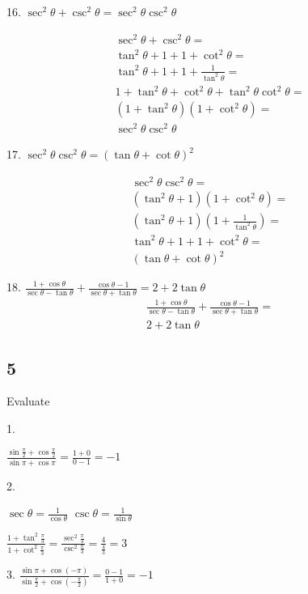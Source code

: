 \documentclass[]{report}
\begin{document}
16. $\sec^2\theta + \csc^2\theta = \sec^2\theta\csc^2\theta$

\begin{align*}
\sec^2\theta+ \csc^2\theta = \\
\tan^2\theta + 1 + 1 + \cot^2\theta = \\
\tan^2\theta + 1 + 1 + \frac{1}{\tan^2\theta}  = \\
1  + \tan^2\theta  + \cot^2\theta + \tan^2\theta\cot^2\theta = \\
(1 + \tan^2\theta)(1  +   \cot^2\theta) =  \\
\sec^2\theta\csc^2\theta
\end{align*}


17. $\sec^2\theta\csc^2\theta = (\tan \theta + \cot\theta)^2$ 

\begin{align*}
\sec^2\theta\csc^2\theta = \\
(\tan^2\theta+1)(1+\cot^2\theta) = \\
(\tan^2\theta + 1)(1 + \frac{1}{\tan^2\theta}) = \\
\tan^2\theta + 1 + 1 + \cot^2\theta = \\
(\tan \theta + \cot\theta)^2
\end{align*}

18. $\frac{1 + \cos \theta}{\sec \theta - \tan \theta} + \frac{\cos \theta - 1}{\sec \theta + \tan\theta} = 2 + 2\tan\theta$
\begin{align*}
\frac{1 + \cos \theta}{\sec \theta - \tan \theta} + \frac{\cos \theta - 1}{\sec \theta + \tan\theta} = \\
2 + 2\tan\theta
\end{align*}
\subsection{5}

Evaluate

1.

 $\frac{\sin \frac{\pi} {2}  + \cos \frac{\pi}{2}}{\sin \pi + \cos \pi} = \frac{1 + 0}{0 - 1} = -1$


2. 

$\sec \theta= \frac{1}{\cos \theta}$
$\csc \theta = \frac{1}{\sin \theta}$

$\frac{1 + \tan^2 \frac{\pi}{3}}{1 + \cot^2 \frac{\pi}{3}} = \frac{\sec^2 \frac{\pi}{3}}{\csc^2 \frac{\pi}{3}} = \frac{4}{\frac{4}{3}} = 3$

3.
$\frac{\sin \pi + \cos (-\pi)}{\sin\frac{\pi}{2} + \cos(-\frac{\pi}{2})} = \frac{0 - 1}{1 + 0} = -1$
\end{document}
